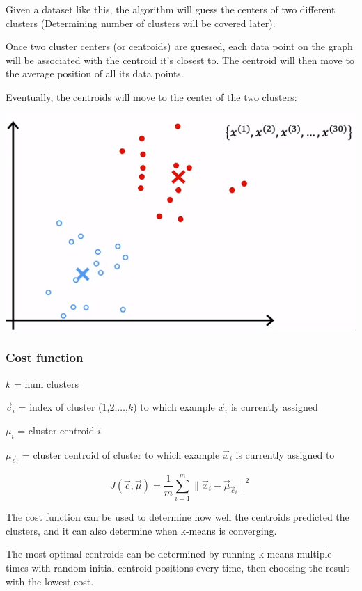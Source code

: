 \documentclass[12pt]{article}
\begin{document}
Given a dataset like this, the algorithm will guess the centers of
two different clusters (Determining number of clusters will be covered later).

Once two cluster centers (or centroids) are guessed, each data point on the graph
will be associated with the centroid it's closest to. The centroid will then move to
the average position of all its data points.

Eventually, the centroids will move to the center of the two clusters:

\includegraphics[scale=.5]{images/cluster-finished.png}

\subsubsection{Cost function}

$k$ = num clusters

$\vec{c}_i$ = index of cluster (1,2,$\ldots$,$k$) to which example $\vec{x}_i$ is currently assigned

$\mu_i$ = cluster centroid $i$

$\mu_{\vec{c}_i}$ = cluster centroid of cluster to which example $\vec{x}_i$ is currently assigned to

\[ J(\vec{c},\vec{\mu}) = \frac{1}{m} \sum_{i=1}^m \| \vec{x}_i - \vec{\mu}_{\vec{c}_i} \|^2 \]

The cost function can be used to determine how well the centroids predicted the clusters, and it can
also determine when k-means is converging.

The most optimal centroids can be determined by running k-means multiple times with random initial centroid
positions every time, then choosing the result with the lowest cost.
\end{document}
